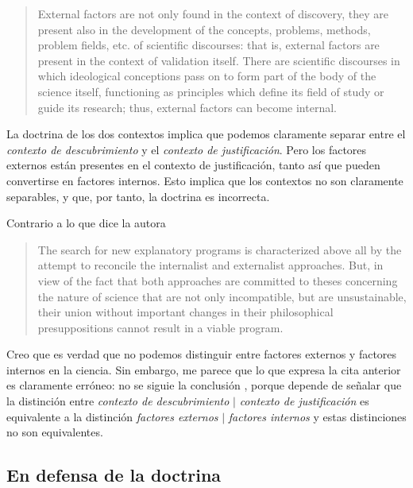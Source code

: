 \begin{quote}

	External factors are not only found in the context of discovery, they are present also in the development of the concepts, problems, methods, problem fields, etc. of scientific discourses: that is, external factors are present in the context of validation itself.
	There are scientific discourses in which ideological conceptions pass on to form part of the body of the science itself, functioning as principles which define its field of study or guide its research; thus, external factors can become internal.

\end{quote}

La doctrina de los dos contextos implica que podemos claramente separar entre el \emph{contexto de descubrimiento} y el \emph{contexto de justificación}.
Pero los factores externos están presentes en el contexto de justificación, tanto así que pueden convertirse en factores internos.
Esto implica que los contextos no son claramente separables, y que, por tanto, la doctrina es incorrecta.

Contrario a lo que dice la autora

\begin{quote}
	The search for new explanatory programs is characterized above all by the attempt to reconcile the internalist and externalist approaches. But, in view of the fact that both approaches are committed to theses concerning the nature of science that are not only incompatible, but are unsustainable, their union without important changes in their philosophical presuppositions cannot result in a viable program. \parencite[][p. 79]{Yturbe1995}
\end{quote}

Creo que es verdad que no podemos distinguir entre factores externos y factores internos en la ciencia.
Sin embargo, me parece que lo que expresa la cita anterior es claramente erróneo: no se siguie la conclusión , porque depende de señalar que la distinción entre  \emph{contexto de descubrimiento} $|$ \emph{contexto de justificación} es equivalente a la distinción \emph{factores externos} $|$ \emph{factores internos} y estas distinciones no son equivalentes.



\subsection{En defensa de la doctrina}

